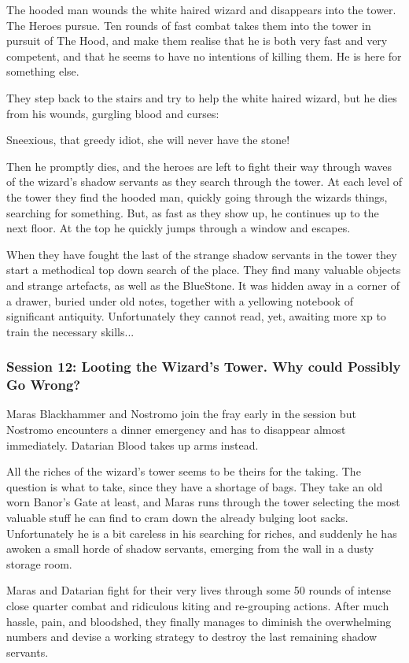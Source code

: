 The hooded man wounds the white haired wizard and disappears into the tower. The Heroes pursue. Ten rounds of fast combat takes them into the tower in pursuit of The Hood, and make them realise that he is both very fast and very competent, and that he seems to have no intentions of killing them. He is here for something else.

They step back to the stairs and try to help the white haired wizard, but he dies from his wounds, gurgling blood and curses:
\begin{readoutloud}
Sneexious, that greedy idiot, she will never have the stone!
\end{readoutloud}
Then he promptly dies, and the heroes are left to fight their way through waves of the wizard's shadow servants as they search through the tower. At each level of the tower they find the hooded man, quickly going through the wizards things, searching for something. But, as fast as they show up, he continues up to the next floor. At the top he quickly jumps through a window and escapes.

When they have fought the last of the strange shadow servants in the tower they start a methodical top down search of the place. They find many valuable objects and strange artefacts, as well as the BlueStone. It was hidden away in a corner of a drawer, buried under old notes, together with a yellowing notebook of significant antiquity. Unfortunately they cannot read, yet, awaiting more xp to train the necessary skills...


\subsubsection*{Session 12: Looting the Wizard's Tower. Why could Possibly Go Wrong?}
Maras Blackhammer and Nostromo join the fray early in the session but Nostromo encounters a dinner emergency and has to disappear almost immediately. Datarian Blood takes up arms instead.

All the riches of the wizard's tower seems to be theirs for the taking. The question is what to take, since they have a shortage of bags. They take an old worn Banor's Gate at least, and Maras runs through the tower selecting the most valuable stuff he can find to cram down the already bulging loot sacks. Unfortunately he is a bit careless in his searching for riches, and suddenly he has awoken a small horde of shadow servants, emerging from the wall in a dusty storage room.

Maras and Datarian fight for their very lives through some 50 rounds of intense close quarter combat and ridiculous kiting and re-grouping actions. After much hassle, pain, and bloodshed, they finally manages to diminish the overwhelming numbers and devise a working strategy to destroy the last remaining shadow servants.

